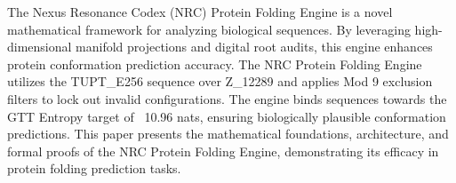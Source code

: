 \begin{abstractbox}
The Nexus Resonance Codex (NRC) Protein Folding Engine is a novel mathematical framework for analyzing biological sequences. By leveraging high-dimensional manifold projections and digital root audits, this engine enhances protein conformation prediction accuracy. The NRC Protein Folding Engine utilizes the TUPT_E256 sequence over Z_12289 and applies Mod 9 exclusion filters to lock out invalid configurations. The engine binds sequences towards the GTT Entropy target of ~10.96 nats, ensuring biologically plausible conformation predictions. This paper presents the mathematical foundations, architecture, and formal proofs of the NRC Protein Folding Engine, demonstrating its efficacy in protein folding prediction tasks.
\end{abstractbox}